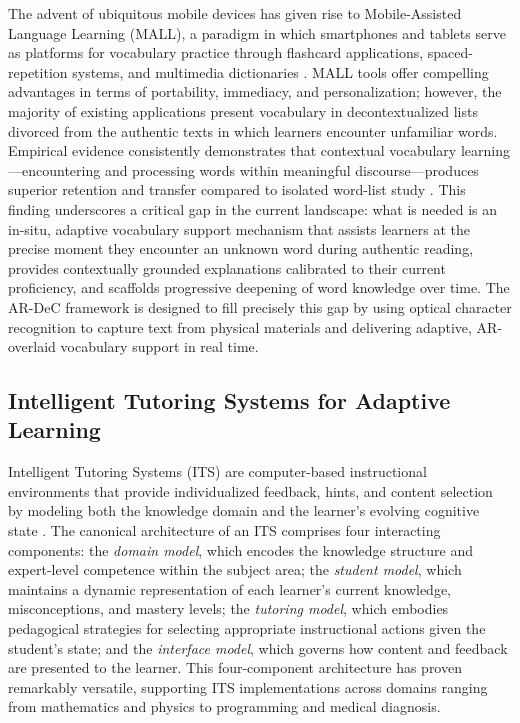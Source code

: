 The advent of ubiquitous mobile devices has given rise to Mobile-Assisted Language Learning (MALL), a paradigm in which smartphones and tablets serve as platforms for vocabulary practice through flashcard applications, spaced-repetition systems, and multimedia dictionaries \cite{Kukulska2009, Chee2017}. MALL tools offer compelling advantages in terms of portability, immediacy, and personalization; however, the majority of existing applications present vocabulary in decontextualized lists divorced from the authentic texts in which learners encounter unfamiliar words. Empirical evidence consistently demonstrates that contextual vocabulary learning---encountering and processing words within meaningful discourse---produces superior retention and transfer compared to isolated word-list study \cite{Webb2007, Schmitt2008}. This finding underscores a critical gap in the current landscape: what is needed is an in-situ, adaptive vocabulary support mechanism that assists learners at the precise moment they encounter an unknown word during authentic reading, provides contextually grounded explanations calibrated to their current proficiency, and scaffolds progressive deepening of word knowledge over time. The AR-DeC framework is designed to fill precisely this gap by using optical character recognition to capture text from physical materials and delivering adaptive, AR-overlaid vocabulary support in real time.

\subsection{Intelligent Tutoring Systems for Adaptive Learning}
\label{subsec:its}

Intelligent Tutoring Systems (ITS) are computer-based instructional environments that provide individualized feedback, hints, and content selection by modeling both the knowledge domain and the learner's evolving cognitive state \cite{VanLehn2011}. The canonical architecture of an ITS comprises four interacting components: the \textit{domain model}, which encodes the knowledge structure and expert-level competence within the subject area; the \textit{student model}, which maintains a dynamic representation of each learner's current knowledge, misconceptions, and mastery levels; the \textit{tutoring model}, which embodies pedagogical strategies for selecting appropriate instructional actions given the student's state; and the \textit{interface model}, which governs how content and feedback are presented to the learner. This four-component architecture has proven remarkably versatile, supporting ITS implementations across domains ranging from mathematics and physics to programming and medical diagnosis.

